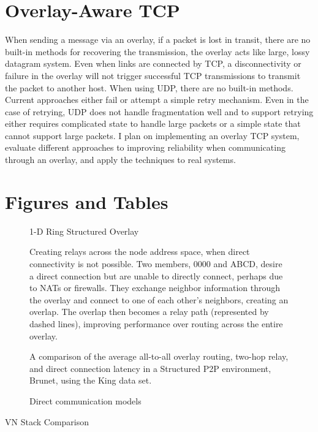 \section{Overlay-Aware TCP}
When sending a message via an overlay, if a packet is lost in transit, there
are no built-in methods for recovering the transmission, the overlay acts like
large, lossy datagram system.  Even when links are connected by TCP, a
disconnectivity or failure in the overlay will not trigger successful TCP
transmissions to transmit the packet to another host.  When using UDP, there
are no built-in methods.  Current approaches either fail or attempt a simple
retry mechanism.  Even in the case of retrying, UDP does not handle
fragmentation well and to support retrying either requires complicated state to
handle large packets or a simple state that cannot support large packets.  I
plan on implementing an overlay TCP system, evaluate different approaches to
improving reliability when communicating through an overlay, and apply the
techniques to real systems.

\section{Figures and Tables}

\begin{figure}[ht]
\centering
\caption{1-D Ring Structured Overlay}
\label{fig:ring_overlay}
\end{figure}

\begin{figure}[ht]
\centering
{}
\caption[Proactive relay creation]{Creating relays across the node address
space, when direct connectivity is not possible.  Two members, 0000 and ABCD, 
desire a direct connection but are unable to directly connect, perhaps due to
NATs or firewalls.  They exchange neighbor information through the overlay and
connect to one of each other's neighbors, creating an overlap.  The overlap
then becomes a relay path (represented by dashed lines), improving performance
over routing across the entire overlay.}
\label{fig:relay}
\end{figure}

\begin{figure}[ht]
\centering
{}
\caption[Relay evaluation]{A comparison of the average all-to-all overlay
routing, two-hop relay, and direct connection latency in a Structured P2P
environment, Brunet, using the King data set.}
\label{fig:simulated_relays}
\end{figure}

\begin{figure}[ht]
\centering
\caption{Direct communication models}
\label{fig:direct_communication}
\end{figure}

\begin{table}[ht]
\caption{VN Stack Comparison}
\centering
\end{table}
